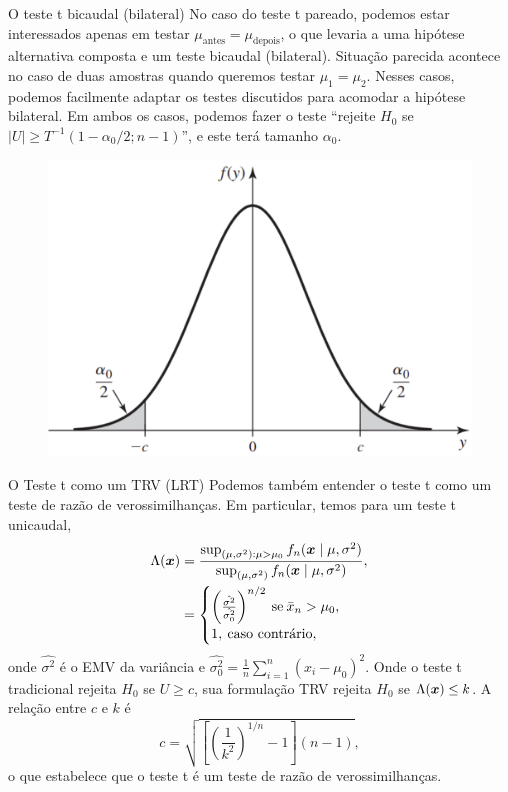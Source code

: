 \begin{frame}{O teste t bicaudal (bilateral)}
No caso do  teste t pareado, podemos estar interessados apenas em testar $\mu_{\text{antes}}= \mu_{\text{depois}}$, o que levaria a uma hipótese alternativa composta e um teste bicaudal (bilateral).
Situação parecida acontece no caso de duas amostras quando queremos testar $\mu_1 = \mu_2$.
Nesses casos, podemos facilmente adaptar os testes discutidos para acomodar a hipótese bilateral.
Em ambos os casos, podemos fazer o teste ``rejeite $H_0$ se $|U|\geq T^{-1}(1-\alpha_0/2; n-1)$'', e este terá tamanho $\alpha_0$.
\begin{figure}
 \begin{center}
  \includegraphics[scale=0.3]{figures/bilateral.pdf}
 \end{center}
\end{figure}
\end{frame}

\begin{frame}{O Teste t como um TRV (LRT)}
Podemos também entender o teste t como um teste de razão de verossimilhanças.
Em particular, temos para um teste t unicaudal, 
\begin{align*}
 \Lambda(\boldsymbol{x}) &= \frac{\sup_{(\mu, \sigma^2):\mu > \mu_0} f_n(\boldsymbol{x} \mid \mu, \sigma^2) }{\sup_{(\mu, \sigma^2)} f_n(\boldsymbol{x} \mid \mu, \sigma^2)}, \\
 &=  \begin{cases}
     \left(\frac{\hat{\sigma^2}}{\hat{\sigma_0^2}}\right)^{n/2} \: \text{se} \: \bar{x}_n> \mu_0,\\
     1,\:\text{caso contrário},
\end{cases} 
\end{align*}
onde $\hat{\sigma^2}$ é o EMV da variância e $\hat{\sigma_0^2} = \frac{1}{n}\sum_{i=1}^n (x_i-\mu_0)^2$.
Onde o teste t tradicional rejeita $H_0$ se $U\geq c$, sua formulação TRV rejeita $H_0$ se $\Lambda(\boldsymbol{x}) \leq k$.
A relação entre $c$ e $k$ é 
\begin{equation*}
 c = \sqrt{\left[\left(\frac{1}{k^2}\right)^{1/n} - 1 \right](n-1)}, 
\end{equation*}
o que estabelece que o teste t é um teste de razão de verossimilhanças.
\end{frame}

